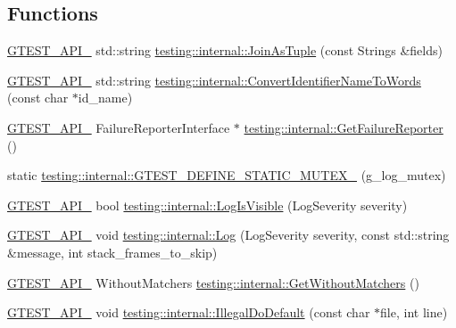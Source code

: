 \subsection*{Functions}
\begin{DoxyCompactItemize}
\item 
\mbox{\hyperlink{gtest-port_8h_aa73be6f0ba4a7456180a94904ce17790}{G\+T\+E\+S\+T\+\_\+\+A\+P\+I\+\_\+}} std\+::string \mbox{\hyperlink{namespacetesting_1_1internal_a4ffe5309bf49f08145ed010a6d244e41}{testing\+::internal\+::\+Join\+As\+Tuple}} (const Strings \&fields)
\item 
\mbox{\hyperlink{gtest-port_8h_aa73be6f0ba4a7456180a94904ce17790}{G\+T\+E\+S\+T\+\_\+\+A\+P\+I\+\_\+}} std\+::string \mbox{\hyperlink{namespacetesting_1_1internal_a0b375abcf3081393e6c420194a541b29}{testing\+::internal\+::\+Convert\+Identifier\+Name\+To\+Words}} (const char $\ast$id\+\_\+name)
\item 
\mbox{\hyperlink{gtest-port_8h_aa73be6f0ba4a7456180a94904ce17790}{G\+T\+E\+S\+T\+\_\+\+A\+P\+I\+\_\+}} Failure\+Reporter\+Interface $\ast$ \mbox{\hyperlink{namespacetesting_1_1internal_aa261c22df383e9007129c92e36e30e62}{testing\+::internal\+::\+Get\+Failure\+Reporter}} ()
\item 
static \mbox{\hyperlink{namespacetesting_1_1internal_a65647f11a4a74a4282c3cc6d422af0f1}{testing\+::internal\+::\+G\+T\+E\+S\+T\+\_\+\+D\+E\+F\+I\+N\+E\+\_\+\+S\+T\+A\+T\+I\+C\+\_\+\+M\+U\+T\+E\+X\+\_\+}} (g\+\_\+log\+\_\+mutex)
\item 
\mbox{\hyperlink{gtest-port_8h_aa73be6f0ba4a7456180a94904ce17790}{G\+T\+E\+S\+T\+\_\+\+A\+P\+I\+\_\+}} bool \mbox{\hyperlink{namespacetesting_1_1internal_a69ffdba5ee36743e88d8f89b79e566ff}{testing\+::internal\+::\+Log\+Is\+Visible}} (Log\+Severity severity)
\item 
\mbox{\hyperlink{gtest-port_8h_aa73be6f0ba4a7456180a94904ce17790}{G\+T\+E\+S\+T\+\_\+\+A\+P\+I\+\_\+}} void \mbox{\hyperlink{namespacetesting_1_1internal_a8a57ce0412334a3f487bbaa8321febbe}{testing\+::internal\+::\+Log}} (Log\+Severity severity, const std\+::string \&message, int stack\+\_\+frames\+\_\+to\+\_\+skip)
\item 
\mbox{\hyperlink{gtest-port_8h_aa73be6f0ba4a7456180a94904ce17790}{G\+T\+E\+S\+T\+\_\+\+A\+P\+I\+\_\+}} Without\+Matchers \mbox{\hyperlink{namespacetesting_1_1internal_ad4e02ea077a717f95a10a03c10272f1c}{testing\+::internal\+::\+Get\+Without\+Matchers}} ()
\item 
\mbox{\hyperlink{gtest-port_8h_aa73be6f0ba4a7456180a94904ce17790}{G\+T\+E\+S\+T\+\_\+\+A\+P\+I\+\_\+}} void \mbox{\hyperlink{namespacetesting_1_1internal_aa67e1e9d28122eedffbb7b6636824f2d}{testing\+::internal\+::\+Illegal\+Do\+Default}} (const char $\ast$file, int line)
\end{DoxyCompactItemize}
